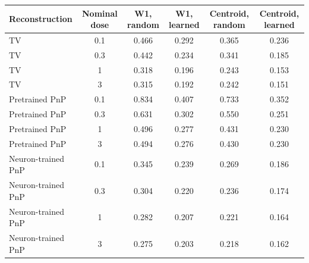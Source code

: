 \begin{tabular}{@{}lccccc@{}}
\toprule
Reconstruction & Nominal dose & W1, random & W1, learned & Centroid, random & Centroid, learned\\
\midrule
TV & 0.1 & 0.466 & 0.292 & 0.365 & 0.236\\
TV & 0.3 & 0.442 & 0.234 & 0.341 & 0.185\\
TV & 1 & 0.318 & 0.196 & 0.243 & 0.153\\
TV & 3 & 0.315 & 0.192 & 0.242 & 0.151\\
Pretrained PnP & 0.1 & 0.834 & 0.407 & 0.733 & 0.352\\
Pretrained PnP & 0.3 & 0.631 & 0.302 & 0.550 & 0.251\\
Pretrained PnP & 1 & 0.496 & 0.277 & 0.431 & 0.230\\
Pretrained PnP & 3 & 0.494 & 0.276 & 0.430 & 0.230\\
Neuron-trained PnP & 0.1 & 0.345 & 0.239 & 0.269 & 0.186\\
Neuron-trained PnP & 0.3 & 0.304 & 0.220 & 0.236 & 0.174\\
Neuron-trained PnP & 1 & 0.282 & 0.207 & 0.221 & 0.164\\
Neuron-trained PnP & 3 & 0.275 & 0.203 & 0.218 & 0.162\\
\bottomrule
\end{tabular}
